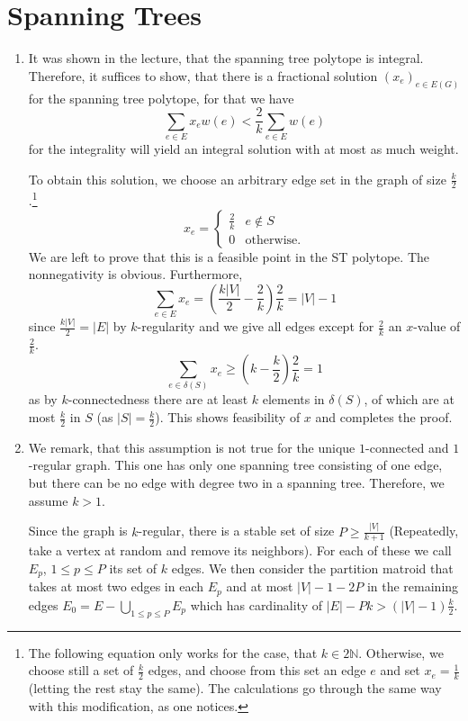 \documentclass{scrartcl}
\newcommand\1{\mathbf{1}}
\begin{document}
\section{Spanning Trees}
\begin{enumerate}
\item
It was shown in the lecture, that the spanning tree polytope is integral. Therefore, it suffices to show, that there is a fractional solution $(x_e)_{e \in E(G)}$ for the spanning tree polytope, for that we have
\[
\sum_{e \in E} x_e w(e) < \frac{2}{k} \sum_{e \in E} w(e)
\]
for the integrality will yield an integral solution with at most as much weight.

To obtain this solution, we choose an arbitrary edge set in the graph of size $\frac{k}{2}$.\footnote{\label{footnote}The following equation only works for the case, that $k\in 2\mathbb{N}$. Otherwise, we choose still a set of $\frac{k}{2}$ edges, and choose from this set an edge $e$ and set $x_e = \frac{1}{k}$ (letting the rest stay the same). The calculations go through the same way with this modification, as one notices.}
\[
x_e = \begin{cases} \frac{2}{k} & e \notin S \\ 0 &\text{otherwise.}\end{cases}
\]
We are left to prove that this is a feasible point in the ST polytope. The nonnegativity is obvious. Furthermore,
\[
\sum_{e \in E} x_e =\left( \frac{k\lvert V \rvert}{2} - \frac{2}{k}\right)\frac{2}{k}=\lvert V \rvert - 1
\]
since $\frac{k\lvert V \rvert}{2} = \lvert E \rvert$ by $k$-regularity and we give all edges except for $\frac{2}{k}$ an $x$-value of $\frac{2}{k}$.
\[
\sum_{e \in \delta(S)} x_e \ge \left (k-\frac{k}{2}\right) \frac{2}{k} = 1
\]
as by $k$-connectedness there are at least $k$ elements in $\delta (S)$, of which are at most $\frac{k}{2}$ in $S$ (as $\lvert S \rvert = \frac{k}{2}$). This shows feasibility of $x$ and completes the proof.
\item
We remark, that this assumption is not true for the unique $1$-connected and $1$-regular graph. This one has only one spanning tree consisting of one edge, but there can be no edge with degree two in a spanning tree. Therefore, we assume $k>1$.

Since the graph is $k$-regular, there is a stable set of size $P \ge \frac{|V|}{k+1}$ (Repeatedly, take a vertex at random and remove its neighbors). For each of these we call $E_p$, $1 \leq p \leq P$ its set of $k$ edges. We then consider the partition matroid that takes at most two edges in each $E_p$ and at most $|V| - 1 - 2 P$ in the remaining edges $E_0 = E-\bigcup_{1\le p \le P} E_p$ which has cardinality of $\lvert E\rvert - Pk > (\lvert V\rvert - 1)\frac{k}{2}$.


\end{enumerate}
\end{document}
